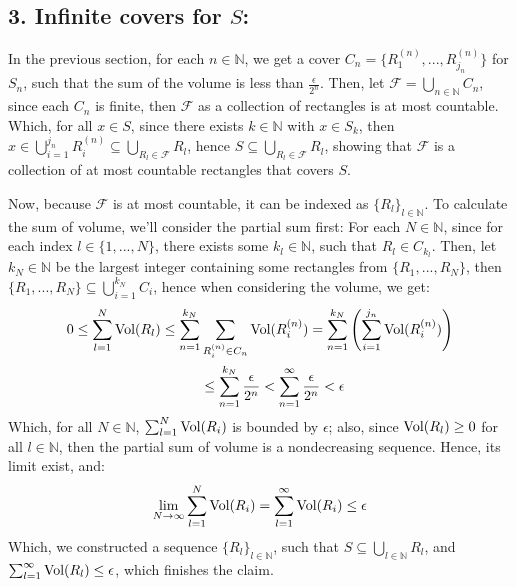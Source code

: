 \documentclass{article}
\begin{document}
\subsection*{3. Infinite covers for $S$:}
In the previous section, for each $n\in\mathbb{N}$, we get a cover $C_n=\{R_1^{(n)},...,R_{j_n}^{(n)}\}$ for $S_n$, such that the sum of the volume is less than $\frac{\epsilon}{2^n}$. Then, let $\mathcal{F}=\bigcup_{n\in\mathbb{N}}C_n$, since each $C_n$ is finite, then $\mathcal{F}$ as a collection of rectangles is at most countable. Which, for all $x\in S$, since there exists $k\in\mathbb{N}$ with $x\in S_k$, then $x\in \bigcup_{i=1}^{j_n}R_i^{(n)}\subseteq \bigcup_{R_l\in \mathcal{F}}R_l$, hence $S\subseteq \bigcup_{R_l\in\mathcal{F}}R_l$, showing that $\mathcal{F}$ is a collection of at most countable rectangles that covers $S$.

Now, because $\mathcal{F}$ is at most countable, it can be indexed as $\{R_l\}_{l\in\mathbb{N}}$. To calculate the sum of volume, we'll consider the partial sum first: For each $N\in\mathbb{N}$, since for each index $l\in \{1,...,N\}$, there exists some $k_l\in \mathbb{N}$, such that $R_l\in C_{k_l}$. Then, let $k_N\in\mathbb{N}$ be the largest integer containing some rectangles from $\{R_1,...,R_N\}$, then $\{R_1,...,R_N\}\subseteq \bigcup_{i=1}^{k_N}C_i$, hence when considering the volume, we get:
\begin{equation}
    \begin{split}
        0\leq \sum_{l=1}^{N}\textmd{Vol}(R_l)\leq \sum_{n=1}^{k_N}&\sum_{R_i^{(n)}\in C_n}\textmd{Vol}(R_i^{(n)}) = \sum_{n=1}^{k_N}\left(\sum_{i=1}^{j_n}\textmd{Vol}(R_i^{(n)})\right) \\
        &\leq \sum_{n=1}^{k_N}\frac{\epsilon}{2^n} < \sum_{n=1}^{\infty}\frac{\epsilon}{2^n}<\epsilon
    \end{split}
\end{equation}
Which, for all $N\in\mathbb{N}$, $\sum_{l=1}^{N}\textmd{Vol}(R_i)$ is bounded by $\epsilon$; also, since $\textmd{Vol}(R_l)\geq 0$ for all $l\in\mathbb{N}$, then the partial sum of volume is a nondecreasing sequence. Hence, its limit exist, and:
\begin{equation}
    \lim_{N\rightarrow\infty}\sum_{l=1}^{N}\textmd{Vol}(R_i) = \sum_{l=1}^{\infty}\textmd{Vol}(R_i) \leq \epsilon
\end{equation}
Which, we constructed a sequence $\{R_l\}_{l\in\mathbb{N}}$, such that $S\subseteq \bigcup_{l\in\mathbb{N}}R_l$, and $\sum_{l=1}^{\infty}\textmd{Vol}(R_l)\leq \epsilon$, which finishes the claim.
\end{document}
